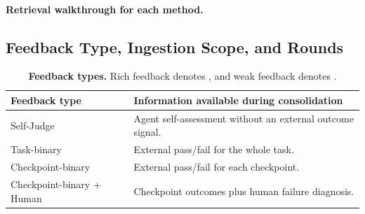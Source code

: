 \begin{table}[h]
\caption{\textbf{Representation-specific retrieval adapters.} The executor
loop is shared, while each adapter exposes the native organization of its
memory representation. ``Search'' is semantic search over file contents,
and ``index'' and ``routing'' are the representation's own entry-point file.}
\label{tab:retrieval-adapters}
\centering
{}
\end{table}

\paragraph{Retrieval walkthrough for each method.}

\subsection{Feedback Type, Ingestion Scope, and Rounds}

\begin{table}[h]
\caption{\textbf{Feedback types.} Rich feedback denotes , and weak feedback denotes .}
\label{tab:feedback-definitions}
\centering
\small
\begin{tabularx}{\linewidth}{@{}lX@{}}
\toprule
Feedback type & Information available during consolidation \\
\midrule
Self-Judge & Agent self-assessment without an external outcome signal. \\
Task-binary & External pass/fail for the whole task. \\
Checkpoint-binary & External pass/fail for each checkpoint. \\
Checkpoint-binary + Human & Checkpoint outcomes plus human failure diagnosis. \\
\bottomrule
\end{tabularx}
\end{table}

